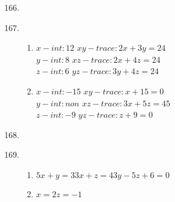 \documentclass[11pt]{amsbook}
\begin{document}
	
\begin{enumerate}[label=\arabic*.]
\setcounter{enumi}{165}
	\item
		\begin{enumerate}[label=\alph*)]
		\end{enumerate}
		
\addtocounter{enumi}{1}
	\item 	
		\begin{enumerate}[label=\alph*)]	
				\item 
				$x-int: 12$\hspace{8pt}
				$xy-trace: 2x+3y=24$\\
				$y-int: 8$\hspace{12pt}
				$xz-trace: 2x+4z=24$\\
				$z-int: 6$\hspace{12pt}
				$yz-trace: 3y+4z=24$\\

				\item
				$x-int: -15$\hspace{8pt}
				$xy-trace: x+15=0$\\
				$y-int: non$\hspace{8pt}
				$xz-trace: 3x+5z=45$\\
				$z-int: -9$\hspace{12pt}
				$yz-trace: z+9=0$\\		
		\end{enumerate}

\addtocounter{enumi}{1}
	\item 
		\begin{enumerate}[label=\alph*)]
		\end{enumerate}

\addtocounter{enumi}{1}
	\item
		\begin{enumerate}[label=\alph*)]	
			\item $5x+y=3    3x+z=4    3y-5z+6=0$
			\item $x=2     z=-1$					
		\end{enumerate}


\end{enumerate}
\end{document}
